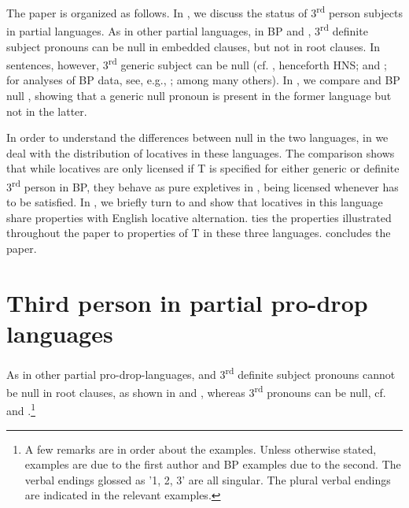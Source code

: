 \documentclass[output=paper]{LSP/langsci}
\begin{document}
The paper is organized as follows. In , we discuss the status of 3\textsuperscript{rd} person subjects in partial  languages. As in other partial  languages, in BP and , 3\textsuperscript{rd} definite subject pronouns can be null in embedded clauses, but not in root clauses. In  sentences, however, 3\textsuperscript{rd} generic subject can be null (cf. \citealt{Holmberg2005,Holmberg2009Three}, henceforth HNS;
\citealt{Holmberg2010finnish} and \citealt{HolmbergEtAl2015}; for analyses of BP data, see, e.g., \citealt{Cavalcante2007,Galves2001,FigueiredoSilva1996,Kato1999,Duarte1995,Nunes1990}; among many others). In , we compare  and BP null , showing that a generic null pronoun is present in the former language but not in the latter.

In order to understand the differences between null  in the two languages, in  we deal with the distribution of locatives in these languages. The comparison shows that while locatives are only licensed if T is specified for either generic or definite 3\textsuperscript{rd} person in BP, they behave as pure expletives in , being licensed whenever  has to be satisfied. In , we briefly turn to  and show that locatives in this language share properties with English locative alternation.  ties the properties illustrated throughout the paper to properties of T in these three languages.  concludes the paper.

\section{Third person in partial pro-drop languages}\label{§2.alexiadou}

As in other partial pro-drop-languages,  and  3\textsuperscript{rd} definite subject pronouns cannot be null in root clauses, as shown in  and , whereas 3\textsuperscript{rd}  pronouns can be null, cf.  and .\footnote{A few remarks are in order about the examples. Unless otherwise stated,  examples are due to the first author and BP examples due to the second. 
The verbal endings glossed as '1, 2, 3' are all singular. The plural verbal endings are indicated in the relevant examples.}
\end{document}
